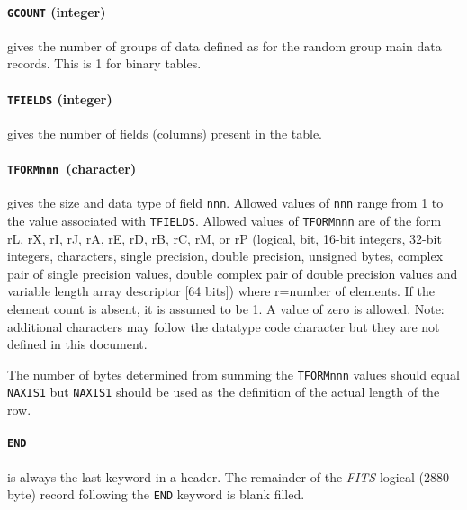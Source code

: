 \paragraph{{\tt GCOUNT} (integer)} gives the number of 
groups of data defined as for the random group main data records. 
This is 1 for binary tables.

\paragraph{{\tt TFIELDS} (integer)} gives the number of 
fields (columns) present in the table. 

\paragraph{{\tt TFORMnnn}\protect\footnotemark[1]\ (character)} 
 gives 
the size and data type of field {\tt nnn}. 
Allowed values of {\tt nnn} range from 1 to the value associated 
with {\tt TFIELDS}.  Allowed values of {\tt TFORMnnn}
are of the form rL, rX, rI, 
rJ, rA, rE, rD, rB, rC, rM, or rP (logical, 
bit, 16-bit integers, 32-bit
integers, characters, single precision, double precision, unsigned
bytes, complex 
{pair of single precision values}, double complex 
{pair of double precision values} 
and variable length array descriptor
[64 bits]) where r=number of elements.  If the element count is absent, it
is assumed to be 1.  A value of zero is allowed.
Note: additional characters may follow the datatype code character
but they are not defined in this document.


   The number of bytes determined from summing the {\tt TFORMnnn} 
values should equal {\tt NAXIS1} but 
{\tt NAXIS1} should be used as the definition of
the actual length of the row.

\paragraph {{\tt END}} is always the last keyword in a
header.  
The remainder of the {\em FITS\/} logical (2880--byte) record 
following the {\tt END} keyword is blank filled.


